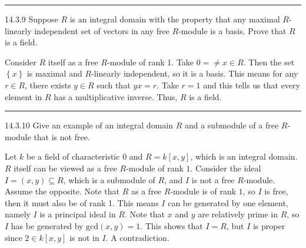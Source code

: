 \documentclass[a4paper, 12pt]{article}
\begin{document}
\noindent\rule{7in}{2.8pt}
\begin{problem}{14.3.9}
Suppose \(R\) is an integral domain with the property that any maximal \(R\)-linearly independent set of vectors in any free \(R\)-module is a basis. Prove that \(R\) is a field.
\end{problem}
\begin{solution}
Consider \(R\) itself as a free \(R\)-module of rank 1. Take \(0=\neq x\in R\). Then the set \(\left\{ x \right\}\) is maximal and \(R\)-linearly independent, so it is a basis. This means for any \(r\in R\), there exists \(y\in R\) such that 
\(yx=r\). Take \(r=1\) and this tells us that every element in \(R\) has a multiplicative inverse. Thus, \(R\) is a field.
\end{solution}

\noindent\rule{7in}{2.8pt}
\begin{problem}{14.3.10}
Give an example of an integral domain \(R\) and a submodule of a free \(R\)-module that is not free.
\end{problem}
\begin{solution}
Let \(k\) be a field of characteristic \(0\) and \(R=k[x,y]\), which is an integral domain. \(R\) itself can be viewed as a free \(R\)-module of rank \(1\).  Consider the ideal \(I=(x,y)\subseteq R\), which is a submodule of \(R\), and \(I\) is not 
a free \(R\)-module. Assume the opposite. Note that \(R\) as a free \(R\)-module is of rank \(1\), so \(I\) is free, then it must also be of rank 1. This means \(I\) can be generated by one element, namely \(I\) is a principal ideal in 
\(R\). Note that \(x\) and \(y\) are relatively prime in \(R\), so \(I\) has be generated by \(\text{gcd}(x,y)=1\). This shows that \(I=R\), but \(I\) is proper since \(2\in k[x,y]\) is not in \(I\). A contradiction.  
\end{solution}
\end{document}
